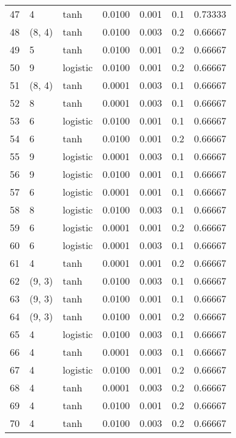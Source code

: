 \begin{tabular}{lllrrrr}
47  &           4 &      tanh &  0.0100 &  0.001 &  0.1 &   0.73333 \\
48  &      (8, 4) &      tanh &  0.0100 &  0.003 &  0.2 &   0.66667 \\
49  &           5 &      tanh &  0.0100 &  0.001 &  0.2 &   0.66667 \\
50  &           9 &  logistic &  0.0100 &  0.001 &  0.2 &   0.66667 \\
51  &      (8, 4) &      tanh &  0.0001 &  0.003 &  0.1 &   0.66667 \\
52  &           8 &      tanh &  0.0001 &  0.003 &  0.1 &   0.66667 \\
53  &           6 &  logistic &  0.0100 &  0.001 &  0.1 &   0.66667 \\
54  &           6 &      tanh &  0.0100 &  0.001 &  0.2 &   0.66667 \\
55  &           9 &  logistic &  0.0001 &  0.003 &  0.1 &   0.66667 \\
56  &           9 &  logistic &  0.0100 &  0.001 &  0.1 &   0.66667 \\
57  &           6 &  logistic &  0.0001 &  0.001 &  0.1 &   0.66667 \\
58  &           8 &  logistic &  0.0100 &  0.003 &  0.1 &   0.66667 \\
59  &           6 &  logistic &  0.0001 &  0.001 &  0.2 &   0.66667 \\
60  &           6 &  logistic &  0.0001 &  0.003 &  0.1 &   0.66667 \\
61  &           4 &      tanh &  0.0001 &  0.001 &  0.2 &   0.66667 \\
62  &      (9, 3) &      tanh &  0.0100 &  0.003 &  0.1 &   0.66667 \\
63  &      (9, 3) &      tanh &  0.0100 &  0.001 &  0.1 &   0.66667 \\
64  &      (9, 3) &      tanh &  0.0100 &  0.001 &  0.2 &   0.66667 \\
65  &           4 &  logistic &  0.0100 &  0.003 &  0.1 &   0.66667 \\
66  &           4 &      tanh &  0.0001 &  0.003 &  0.1 &   0.66667 \\
67  &           4 &  logistic &  0.0100 &  0.001 &  0.2 &   0.66667 \\
68  &           4 &      tanh &  0.0001 &  0.003 &  0.2 &   0.66667 \\
69  &           4 &      tanh &  0.0100 &  0.001 &  0.2 &   0.66667 \\
70  &           4 &      tanh &  0.0100 &  0.003 &  0.2 &   0.66667 \\

\end{tabular}
